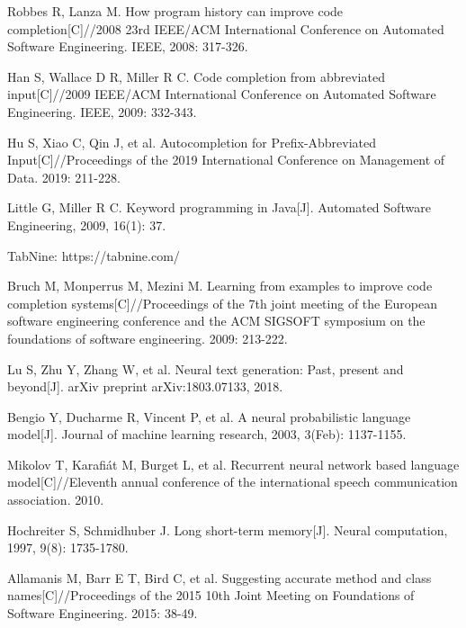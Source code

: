 \documentclass[PRO,english]{ipsj}
\begin{document}
\begin{thebibliography}{10}
 Robbes R, Lanza M. How program history can improve code completion[C]//2008 23rd IEEE/ACM International Conference on Automated Software Engineering. IEEE, 2008: 317-326.

 Han S, Wallace D R, Miller R C. Code completion from abbreviated input[C]//2009 IEEE/ACM International Conference on Automated Software Engineering. IEEE, 2009: 332-343.

 Hu S, Xiao C, Qin J, et al. Autocompletion for Prefix-Abbreviated Input[C]//Proceedings of the 2019 International Conference on Management of Data. 2019: 211-228.

 Little G, Miller R C. Keyword programming in Java[J]. Automated Software Engineering, 2009, 16(1): 37.

 TabNine: https://tabnine.com/

 Bruch M, Monperrus M, Mezini M. Learning from examples to improve code completion systems[C]//Proceedings of the 7th joint meeting of the European software engineering conference and the ACM SIGSOFT symposium on the foundations of software engineering. 2009: 213-222.

 Lu S, Zhu Y, Zhang W, et al. Neural text generation: Past, present and beyond[J]. arXiv preprint arXiv:1803.07133, 2018.

 Bengio Y, Ducharme R, Vincent P, et al. A neural probabilistic language model[J]. Journal of machine learning research, 2003, 3(Feb): 1137-1155.

 Mikolov T, Karafiát M, Burget L, et al. Recurrent neural network based language model[C]//Eleventh annual conference of the international speech communication association. 2010.


 Hochreiter S, Schmidhuber J. Long short-term memory[J]. Neural computation, 1997, 9(8): 1735-1780.

 Allamanis M, Barr E T, Bird C, et al. Suggesting accurate method and class names[C]//Proceedings of the 2015 10th Joint Meeting on Foundations of Software Engineering. 2015: 38-49.

\end{thebibliography}
\end{document}
